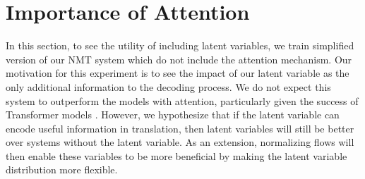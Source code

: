 





\section{Importance of Attention}

In this section, to see the utility of including latent variables, we train simplified version of our \ac{NMT} system which do not include the attention mechanism. Our motivation for this experiment is to see the impact of our latent variable as the only additional information to the decoding process. We do not expect this system to outperform the models with attention, particularly given the success of Transformer models \cite{vaswani2017attentionTransformer}. However, we hypothesize that if the latent variable can encode useful information in translation, then latent variables will still be better over systems without the latent variable. As an extension, normalizing flows will then enable these variables to be more beneficial by making the latent variable distribution more flexible.

